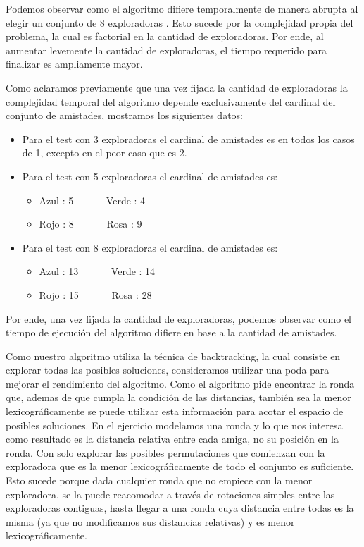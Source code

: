 \documentclass[11pt]{article}
\begin{document}
Podemos observar como el algoritmo difiere temporalmente de manera abrupta al elegir un conjunto de 8 exploradoras
. Esto sucede por la complejidad propia del problema, la cual es factorial en la cantidad de exploradoras.
Por ende, al aumentar levemente la cantidad de exploradoras, el tiempo requerido para finalizar es ampliamente mayor.

Como aclaramos previamente que una vez fijada la cantidad de exploradoras la complejidad temporal del algoritmo 
depende exclusivamente del cardinal del conjunto de amistades, mostramos los siguientes datos:
\begin{itemize}
  \item Para el test con 3 exploradoras el cardinal de amistades es en todos los casos de 1, excepto 
    en el peor caso que es 2.
  \item Para el test con 5 exploradoras el cardinal de amistades es:
    \begin{itemize}
      \item Azul : 5  \ \ \ \ \ \ \inlineitem Verde :  4
      \item Rojo : 8  \ \ \ \ \ \ \inlineitem Rosa  :  9
    \end{itemize}
  \item Para el test con 8 exploradoras el cardinal de amistades es:
    \begin{itemize}
      \item Azul : 13  \ \ \ \ \ \ \inlineitem Verde :  14
      \item Rojo : 15  \ \ \ \ \ \ \inlineitem Rosa  :  28
    \end{itemize}
\end{itemize}

Por ende, una vez fijada la cantidad de exploradoras, podemos observar como el tiempo de ejecución del algoritmo 
difiere en base a la cantidad de amistades. 

Como nuestro algoritmo utiliza la técnica de backtracking, la cual consiste en explorar todas las posibles 
soluciones, consideramos utilizar una poda para mejorar el rendimiento del algoritmo. Como el algoritmo pide 
encontrar la ronda que, ademas de que cumpla la condición de las distancias, también sea la menor lexicográficamente 
se puede utilizar esta información para acotar el espacio de posibles soluciones. En el ejercicio modelamos 
una ronda y lo que nos interesa como resultado es la distancia relativa entre cada amiga, no su posición en la ronda. 
Con solo explorar las posibles permutaciones que comienzan con la exploradora que es la menor lexicográficamente 
de todo el conjunto es suficiente. Esto sucede porque dada cualquier ronda que no empiece con la menor exploradora, 
se la puede reacomodar a través de rotaciones simples entre las exploradoras contiguas, hasta llegar a una ronda 
cuya distancia entre todas es la misma (ya que no modificamos sus distancias relativas) y es menor lexicográficamente.
\end{document}
